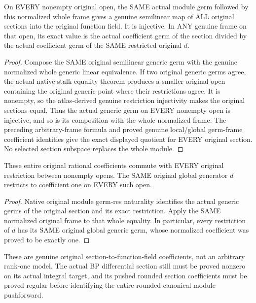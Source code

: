\begin{theorem}
\label{sc0-line-section-ratios:every-original-section}
\leanok
On EVERY nonempty original open, the SAME actual module germ followed
by this normalized whole frame gives a genuine semilinear map of ALL
original sections into the original function field. It is injective.
In ANY genuine frame on that open, its exact value is the actual
coefficient germ of the section divided by the actual coefficient
germ of the SAME restricted original $d$.
\end{theorem}
\begin{proof}
Compose the SAME original semilinear generic germ with the genuine
normalized whole generic linear equivalence. If two original generic
germs agree, the actual native stalk equality theorem produces a
smaller original open containing the original generic point where
their restrictions agree. It is nonempty, so the atlas-derived genuine
restriction injectivity makes the original sections equal. Thus the
actual generic germ on EVERY nonempty open is injective, and so is
its composition with the whole normalized frame. The preceding
arbitrary-frame formula and proved genuine local/global germ-frame
coefficient identities give the exact displayed quotient for EVERY
original section. No selected section subspace replaces the whole module.
\end{proof}

\begin{theorem}
\label{sc0-line-section-ratios:original-restriction-generator}
\leanok
These entire original rational coefficients commute with EVERY original
restriction between nonempty opens. The SAME original global generator
$d$ restricts to coefficient one on EVERY such open.
\end{theorem}
\begin{proof}
Native original module germ-res naturality identifies the actual generic
germs of the original section and its exact restriction. Apply the SAME
normalized original frame to that whole equality. In particular, every
restriction of $d$ has its SAME original global generic germ, whose
normalized coefficient was proved to be exactly one.
\end{proof}

These are genuine original section-to-function-field coefficients,
not an arbitrary rank-one model. The actual BP differential section
still must be proved nonzero on its actual integral target, and its
pushed rounded section coefficients must be proved regular before
identifying the entire rounded canonical module pushforward.
